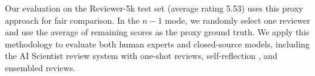 \documentclass{article} %
\begin{document}
Our evaluation on the Reviewer-5k test set (average rating 5.53) uses this proxy approach for fair comparison. In the $n-1$ mode, we randomly select one reviewer and use the average of remaining scores as the proxy ground truth. We apply this methodology to evaluate both human experts and closed-source models, including the AI Scientist review system \citep{lu2024ai} with one-shot reviews, self-reflection \citep{shinn2023reflexion}, and ensembled reviews.


\end{document}
